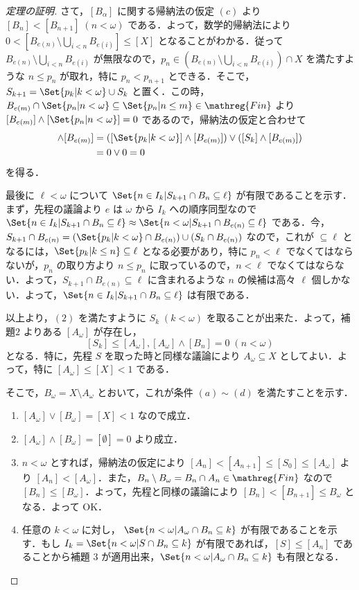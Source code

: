 \documentclass[a4j,xelatex,ja=standard]{bxjsarticle}
\newcommand{\Fin}{\mathreg{Fin}}
\begin{document}
\begin{proof}[定理の証明]
 さて，$[B_\alpha]$ に関する帰納法の仮定 $(c)$ より $[B_n] < [B_{n+1}] \; (n < \omega)$ である．よって，数学的帰納法により $0 < [B_{e(n)} \setminus \bigcup_{i < n} B_{e(i)}] \leq [X]$ となることがわかる．従って $B_{e(n)} \setminus \bigcup_{i < n} B_{e(i)}$ が無限なので，$p_n \in (B_{e(n)} \setminus \bigcup_{i<n} B_{e(i)}) \cap X$ を満たすような $n \leq p_n$ が取れ，特に $p_n < p_{n+1}$ とできる．そこで，$S_{k+1} = \Set{p_k | k < \omega} \cup S_k$ と置く．この時，$B_{e(m)} \cap \Set{ p_n | n < \omega} \subseteq \Set{ p_n | n \leq m } \in \Fin$ より $[B_{e(m)}] \wedge [\Set{ p_n | n < \omega}] = 0$ であるので，帰納法の仮定と合わせて
 \begin{align*}
  [S_{k+1}] \wedge [B_{e(m)}] &= ([\Set{p_k | k < \omega}] \wedge [B_{e(m)}]) \vee ([S_k] \wedge [B_{e(m)}])\\
  &= 0 \vee 0 = 0 
 \end{align*}
 を得る．

 最後に $\ell < \omega$ について $\Set{n \in I_k | S_{k+1} \cap B_n \subseteq \ell}$ が有限であることを示す．まず，先程の議論より $e$ は $\omega$ から $I_k$ への順序同型なので $\Set{ n \in I_k | S_{k+1} \cap B_n \subseteq \ell} \approx \Set{ n < \omega | S_{k+1} \cap B_{e(n)} \subseteq \ell}$ である．今，$S_{k+1} \cap B_{e(n)} = (\Set{p_k | k < \omega} \cap B_{e(n)}) \cup (S_k \cap B_{e(n)})$ なので，これが $\subseteq \ell$ となるには，$\Set{p_k | k \leq n} \subseteq \ell$ となる必要があり，特に $p_n < \ell$ でなくてはならないが，$p_n$ の取り方より $n \leq p_n$ に取っているので，$n < \ell$ でなくてはならない．よって，$S_{k+1} \cap B_{e(n)} \subseteq \ell$ に含まれるような $n$ の候補は高々 $\ell$ 個しかない．よって，$\Set{ n \in I_k | S_{k+1} \cap B_n \subseteq \ell}$ は有限である．

 以上より，$(2)$ を満たすように $S_k \; (k < \omega)$ を取ることが出来た．よって，補題$2$ よりある $[A_\omega]$ が存在し，
 \[
  [S_k] \leq [A_\omega], [A_\omega] \wedge [B_n] = 0 \; (n < \omega)
 \]
 となる．特に，先程 $S$ を取った時と同様な議論により $A_\omega \subseteq X$ としてよい．よって，特に $[A_\omega] \leq [X] < 1 $ である．

 そこで，$B_\omega = X \setminus A_\omega$ とおいて，これが条件 $(a) \sim (d)$ を満たすことを示す．

 \begin{enumerate}[label=(\alph*)]
  \item $[A_\omega] \vee [B_\omega] = [X] < 1$ なので成立．
  \item $[A_\omega] \wedge [B_\omega] = [\emptyset] = 0$ より成立．
  \item $n < \omega$ とすれば，帰納法の仮定により $[A_n] < [A_{n+1}] \leq [S_0] \leq [A_\omega]$ より $[A_n] < [A_\omega]$．また，$B_n \setminus B_\omega = B_n \cap A_n \in \Fin$ なので $[B_n] \leq [B_\omega]$．よって，先程と同様の議論により $[B_n] < [B_{n+1}] \leq B_\omega$ となる．よって OK．
  \item 任意の $k < \omega$ に対し， $\Set{n < \omega | A_\omega \cap B_n \subseteq k}$ が有限であることを示す．もし $I_k = \Set{ n < \omega | S \cap B_n \subseteq k}$ が有限であれば，$[S] \leq [A_n]$ であることから補題 $3$ が適用出来，$\Set{ n < \omega | A_\omega \cap B_n \subseteq k }$ も有限となる．


\end{enumerate}
\end{proof}
\end{document}
